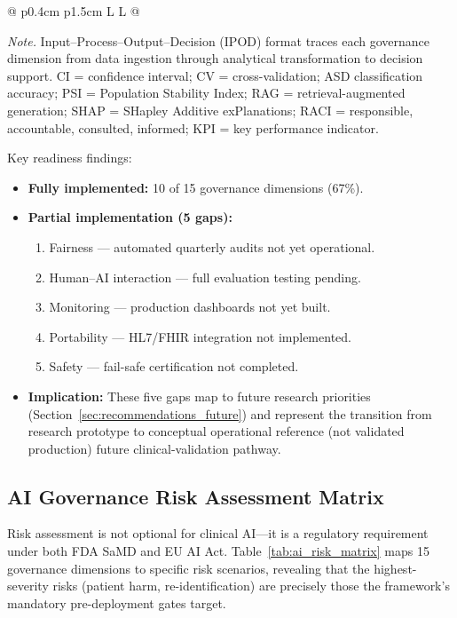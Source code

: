 \begin{table}[!htbp]
\begin{tabularx}{\textwidth}{@{} p{0.4cm} p{1.5cm} L L @{}}
\bottomrule
\end{tabularx}
\vspace{0.5em}\noindent\textit{Note.} Input--Process--Output--Decision (IPOD) format traces each governance dimension from data ingestion through analytical transformation to decision support. CI = confidence interval; CV = cross-validation; ASD classification accuracy; PSI = Population Stability Index; RAG = retrieval-augmented generation; SHAP = SHapley Additive exPlanations; RACI = responsible, accountable, consulted, informed; KPI = key performance indicator.
\end{table}
\fi

Key readiness findings:

\begin{itemize}
    \item \textbf{Fully implemented:} 10 of 15 governance dimensions (67\%).
    \item \textbf{Partial implementation (5 gaps):}
    \begin{enumerate}
        \item Fairness --- automated quarterly audits not yet operational.
        \item Human--AI interaction --- full evaluation testing pending.
        \item Monitoring --- production dashboards not yet built.
        \item Portability --- HL7/FHIR integration not implemented.
        \item Safety --- fail-safe certification not completed.
    \end{enumerate}
    \item \textbf{Implication:} These five gaps map to future research priorities (Section~\ref{sec:recommendations_future}) and represent the transition from research prototype to conceptual operational reference (not validated production) future clinical-validation pathway.
\end{itemize}

\subsection{AI Governance Risk Assessment Matrix}

Risk assessment is not optional for clinical AI---it is a regulatory requirement under both FDA SaMD and EU AI Act. Table~\ref{tab:ai_risk_matrix} maps 15 governance dimensions to specific risk scenarios, revealing that the highest-severity risks (patient harm, re-identification) are precisely those the framework's mandatory pre-deployment gates target.

